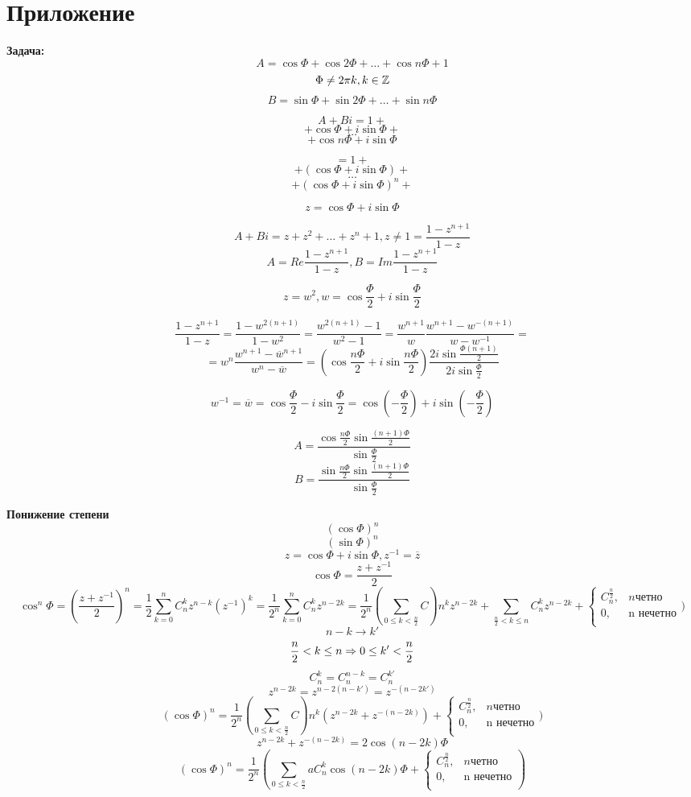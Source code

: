 ﻿\section{Приложение}
{\bf Задача:}
$$A = \cos \Phi + \cos 2\Phi + \ldots + \cos n \Phi + 1$$
$$\Phi \ne 2\pi k, k \in \mathbb{Z}$$
$$B = \sin \Phi + \sin 2\Phi + \ldots + \sin n \Phi$$

$$A + Bi = 1 +$$
$$+ \cos \Phi + i \sin \Phi +$$
$$\ldots$$
$$+ \cos n \Phi + i \sin \Phi$$

$$= 1 +$$
$$ + (\cos \Phi + i \sin \Phi) +$$
$$\ldots$$
$$ + (\cos \Phi + i \sin \Phi)^n +$$

$$z = \cos \Phi + i \sin \Phi$$

$$A + Bi = z + z^2 + \ldots + z^n + 1, z \ne 1 = \frac{1 - z^{n + 1}}{1 - z}$$
$$ A = Re\frac{1 - z^{n + 1}}{1 - z}, B = Im \frac{1 - z^{n + 1}}{1 - z}$$

$$ z = w^2, w = \cos \frac{\Phi}{2} + i \sin\frac{\Phi}{2}$$

$$\frac{1 - z^{n + 1}}{1 - z} = \frac{1 - w^{2(n + 1)}}{1 - w^2} = \frac{w^{2(n + 1)} - 1}{w^2 - 1} = \frac{w^{n + 1}}{w}\frac{w^{n + 1} - w^{-(n + 1)}}{w - w^{-1}} = $$
$$= w^{n}\frac{w^{n + 1} - \overline{w}^{n + 1}}{w^n - \overline{w}} = (\cos\frac{n\Phi}{2} + i\sin\frac{n\Phi}{2})\frac{2i\sin\frac{\Phi(n + 1)}{2}}{2i\sin\frac{\Phi}{2}}$$


$$w^{-1} = \overline w = \cos \frac{\Phi}{2} - i\sin \frac{\Phi}{2} = \cos(-\frac{\Phi}{2}) + i\sin(-\frac{\Phi}{2})$$

$$A = \frac{\cos\frac{n\Phi}{2} \sin \frac{(n + 1)\Phi}{2}}{\sin\frac{\Phi}{2}}$$
$$B = \frac{\sin\frac{n\Phi}{2} \sin \frac{(n + 1)\Phi}{2}}{\sin\frac{\Phi}{2}}$$

{\bf Понижение степени}
$$(\cos\Phi)^n$$
$$(\sin\Phi)^n$$
$$z = \cos\Phi + i\sin\Phi, z^{-1} = \overline z$$
$$\cos \Phi = \frac{z + z^{-1}}{2}$$
$$\cos^n\Phi = (\frac{z + z^{-1}}{2})^n = \frac{1}{2}\sum_{k = 0}^{n}C_n^kz^{n - k}(z^{-1})^k = \frac{1}{2^n}\sum_{k = 0}^{n}C_n^kz^{n - 2k} = \frac{1}{2^n}(\sum_{0 \le k < \frac{n}{2}}C)n^kz^{n - 2k} + \sum_{\frac{n}{2} < k\le n}C_n^kz^{n- 2k} + \begin{cases}C_n^{\frac{n}{2}}, & n \text{четно}\\ 0, & \text{n нечетно}\\ \end{cases})$$
$$n - k \to k'$$
$$\frac{n}{2} < k \le n \Rightarrow 0 \le k' < \frac{n}{2}$$
$$C_n^k = C_n^{n - k} = C_n^{k'} $$
$$z^{n - 2k} = z^{n - 2(n - k')} = z^{-(n - 2k')}$$
$$(\cos \Phi)^n = \frac{1}{2^n}(\sum_{0 \le k < \frac{n}{2}}C)n^k(z^{n - 2k} + z^{-(n- 2k)}) + \begin{cases}C_n^{\frac{n}{2}}, & n \text{четно}\\ 0, & \text{n нечетно}\\ \end{cases})$$
$$z^{n - 2k} + z^{-(n - 2k)} = 2 \cos(n - 2k)\Phi$$
$$(\cos \Phi)^{n} = \frac{1}{2^n}(\sum_{0\le k < \frac{n}{2}} a C_n^k \cos(n - 2k)\Phi +  \begin{cases}C_n^{\frac{n}{2}}, & n \text{четно}\\ 0, & \text{n нечетно}\\ \end{cases})$$
